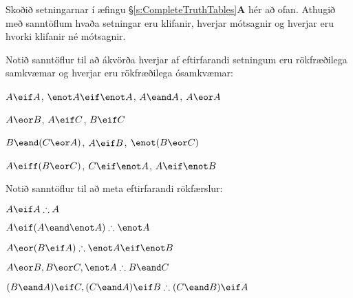 \practiceproblems
\problempart
Skoðið setningarnar í æfingu \S\ref{s:CompleteTruthTables}\textbf{A} hér að ofan. Athugið með sanntöflum hvaða setningar eru klifanir, hverjar mótsagnir og hverjar eru hvorki klifanir né mótsagnir.

\problempart

Notið sanntöflur til að ákvörða hverjar af eftirfarandi setningum eru rökfræðilega samkvæmar og hverjar eru rökfræðilega ósamkvæmar:
\begin{earg}
\item $A\eif A$, $\enot A \eif \enot A$, $A\eand A$, $A\eor A$ %
\item $A\eor B$, $A\eif C$, $B\eif C$ %
\item $B\eand(C\eor A)$, $A\eif B$, $\enot(B\eor C)$  %
\item $A\eiff(B\eor C)$, $C\eif \enot A$, $A\eif \enot B$ %
\end{earg}

\problempart
Notið sanntöflur til að meta eftirfarandi rökfærslur:
\begin{earg}
\item $A\eif A \therefore A$ %
\item $A\eif(A\eand\enot A) \therefore \enot A$ %
\item $A\eor(B\eif A) \therefore\enot A \eif \enot B$ %
\item $A\eor B, B\eor C, \enot A \therefore B \eand C$ %
\item $(B\eand A)\eif C, (C\eand A)\eif B \therefore (C\eand B)\eif A$ %
\end{earg}

